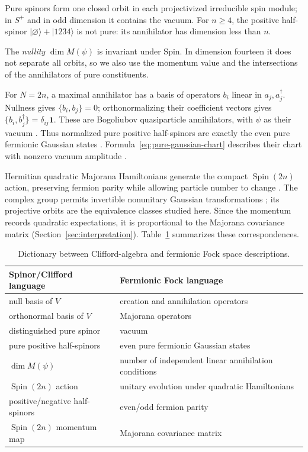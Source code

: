 \documentclass{article}
\theoremstyle{definition}
\theoremstyle{remark}
\newcommand{\Spin}{\operatorname{Spin}}
\newcommand{\ket}[1]{\lvert #1\rangle}
\begin{document}
Pure spinors form one closed orbit in each projectivized irreducible spin
module; in $S^+$ and in odd dimension it contains the vacuum.
For $n\ge4$, the positive half-spinor $\ket\varnothing+\ket{1234}$ is not
pure: its annihilator has dimension less than $n$.

The \emph{nullity} $\dim M(\psi)$ is invariant under Spin. In dimension
fourteen it does not separate all orbits, so we also use the momentum
value and the intersections of the annihilators of pure constituents.

For $N=2n$, a maximal annihilator has a basis of operators $b_i$ linear in
$a_j,a_j^\dagger$. Nullness gives $\{b_i,b_j\}=0$; orthonormalizing their
coefficient vectors gives $\{b_i,b_j^\dagger\}=\delta_{ij}\mathbf1$.
These are Bogoliubov quasiparticle annihilators, with $\psi$ as their
vacuum \cite{Araki1970}. Thus normalized pure positive half-spinors are
exactly the even pure fermionic Gaussian states \cite{HacklBianchi2021}.
Formula~\eqref{eq:pure-gaussian-chart} describes their chart with nonzero
vacuum amplitude \cite{SL2014}.

Hermitian quadratic Majorana Hamiltonians generate the compact
$\Spin(2n)$ action, preserving fermion parity while allowing particle
number to change \cite{Bravyi2005,SL2014}. The complex group permits
invertible nonunitary Gaussian transformations \cite{BalianBrezin1969};
its projective orbits are the equivalence classes studied here. Since the
momentum records quadratic expectations, it is proportional to the
Majorana covariance matrix (Section~\ref{sec:interpretation}).
Table~\ref{table:dictionary} summarizes these correspondences.

\begin{table}[ht]
\centering
\renewcommand{\arraystretch}{1.15}
\begin{tabular}{ll}
\toprule
Spinor/Clifford language & Fermionic Fock language\\
\midrule
null basis of $V$ & creation and annihilation operators\\
orthonormal basis of $V$ & Majorana operators\\
distinguished pure spinor & vacuum\\
pure positive half-spinors & even pure fermionic Gaussian states\\
$\dim M(\psi)$ & number of independent linear annihilation conditions\\
$\Spin(2n)$ action & unitary evolution under quadratic Hamiltonians\\
positive/negative half-spinors & even/odd fermion parity\\
$\Spin(2n)$ momentum map & Majorana covariance matrix\\
\bottomrule
\end{tabular}
\caption{Dictionary between Clifford-algebra and fermionic Fock space
descriptions.}
\label{table:dictionary}
\end{table}
\FloatBarrier
\end{document}
